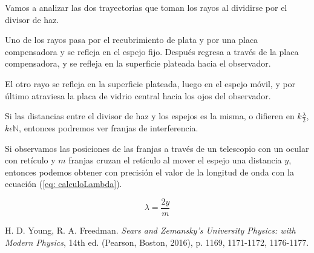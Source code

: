 \documentclass[a4paper,12pt]{article}
\begin{document}
    Vamos a analizar las dos trayectorias que toman los rayos al dividirse por el divisor de haz. 
    
    Uno de los rayos pasa por el recubrimiento de plata y por una placa compensadora y se refleja en el espejo fijo. Después regresa a través de la placa compensadora, y se refleja en la superficie plateada hacia el observador.

    El otro rayo se refleja en la superficie plateada, luego en el espejo móvil, y por último atraviesa la placa de vidrio central hacia los ojos del observador.

    Si las distancias entre el divisor de haz y los espejos es la misma, o difieren en $k \frac{\lambda}{2}$, $k \epsilon \mathbb{N}$, entonces podremos ver franjas de interferencia.

    Si observamos las posiciones de las franjas a través de un telescopio con un ocular con retículo y $m$ franjas cruzan el retículo al mover el espejo una distancia $y$, entonces podemos obtener con precisión el valor de la longitud de onda con la ecuación (\ref{eq: calculoLambda}).

    \begin{equation}
        \lambda = \frac{2y}{m}
        \label{eq: calculoLambda}
    \end{equation}


\begin{thebibliography}{99}

 H. D. Young, R. A. Freedman. \emph{Sears and Zemansky's University Physics: with Modern Physics}, 14th ed. (Pearson, Boston, 2016), p. 1169, 1171-1172, 1176-1177.

\end{thebibliography}
\end{document}
